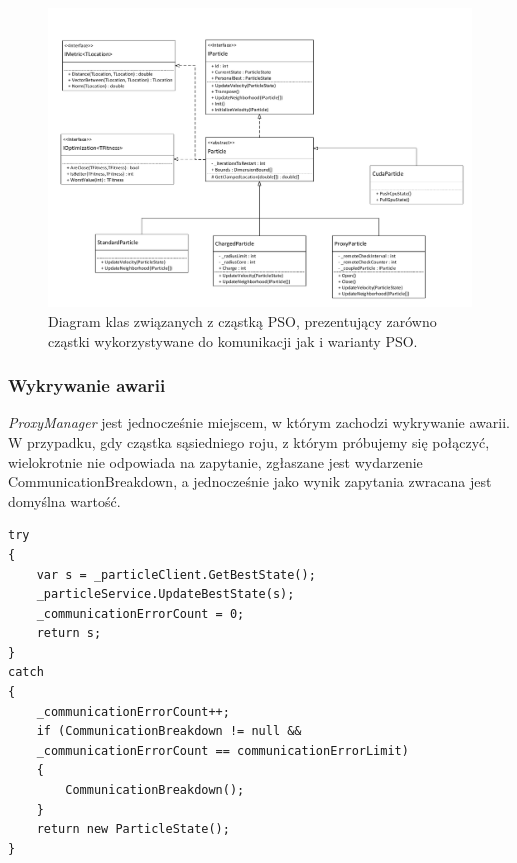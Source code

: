 \documentclass[12pt, twoside, openany, abstract=on]{report}
\theoremstyle{definition}
\begin{document}
\begin{figure}[H]
    \centering
    \includegraphics[scale=0.60]{particleDiagram.pdf} 
 \caption{Diagram klas związanych z cząstką PSO, prezentujący zarówno cząstki wykorzystywane do komunikacji jak i warianty PSO.}
\end{figure}

\subsubsection{Wykrywanie awarii}
\textit{ProxyManager} jest jednocześnie miejscem, w którym zachodzi wykrywanie awarii. W przypadku, gdy cząstka sąsiedniego roju, z którym próbujemy się połączyć, wielokrotnie nie odpowiada na zapytanie, zgłaszane jest wydarzenie CommunicationBreakdown, a jednocześnie jako wynik zapytania zwracana jest domyślna wartość.

\lstset{style=sharpc}
\begin{lstlisting}[frame=single]
try
{
	var s = _particleClient.GetBestState();
	_particleService.UpdateBestState(s);
	_communicationErrorCount = 0;
	return s;
}
catch
{
	_communicationErrorCount++;
	if (CommunicationBreakdown != null &&
	_communicationErrorCount == communicationErrorLimit)
	{
		CommunicationBreakdown();		
	}
	return new ParticleState();
}
\end{lstlisting}
\end{document}

